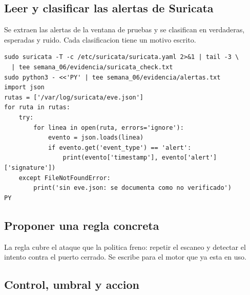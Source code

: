 \documentclass[11pt,a4paper]{article}
\begin{document}
\subsection{Leer y clasificar las alertas de Suricata}

Se extraen las alertas de la ventana de pruebas y se clasifican en verdaderas, esperadas y ruido. Cada clasificacion tiene un motivo escrito.

\begin{lstlisting}[style=estiloCodigo]
sudo suricata -T -c /etc/suricata/suricata.yaml 2>&1 | tail -3 \
  | tee semana_06/evidencia/suricata_check.txt
sudo python3 - <<'PY' | tee semana_06/evidencia/alertas.txt
import json
rutas = ['/var/log/suricata/eve.json']
for ruta in rutas:
    try:
        for linea in open(ruta, errors='ignore'):
            evento = json.loads(linea)
            if evento.get('event_type') == 'alert':
                print(evento['timestamp'], evento['alert']['signature'])
    except FileNotFoundError:
        print('sin eve.json: se documenta como no verificado')
PY
\end{lstlisting}

\subsection{Proponer una regla concreta}

La regla cubre el ataque que la politica freno: repetir el escaneo y detectar el intento contra el puerto cerrado. Se escribe para el motor que ya esta en uso.

\subsection{Control, umbral y accion}
\end{document}
